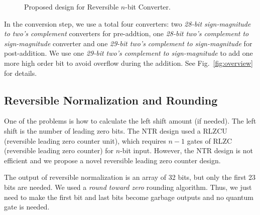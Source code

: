 \documentclass[%
reprint,
 amsmath,amssymb,
 aps,
]{revtex4-1}
\begin{document}
\begin{figure}[h]
\centering
\begin{minipage}{1.2in}
\end{minipage}
\caption{Proposed design for Reversible $n$-bit Converter.}
\label{fig:proposed_converter}
\end{figure}

In the conversion step, we use a total four converters: two \emph{28-bit sign-magnitude to two's complement} converters for pre-addtion, one \emph{28-bit two's complement to sign-magnitude} converter and one \emph{29-bit two's complement to sign-magnitude} for post-addition. We use one \emph{29-bit two's complement to sign-magnitude} to add one more high order bit to avoid overflow during the addition. See Fig.~\ref{fig:overview} for details. 

\subsection{Reversible Normalization and Rounding}

\par One of the problems is how to calculate the left shift amount (if needed). The left shift is the number of leading zero bits. The NTR design used a RLZCU (reversible leading zero counter unit), which requires $n-1$ gates of RLZC (reversible leading zero counter) for $n$-bit input. However, the NTR design is not efficient and we propose a novel reversible leading zero counter design. 
\par The output of reversible normalization is an array of 32 bits, but only the first 23 bits are needed. We used a \emph{round toward zero} rounding algorithm. Thus, we just need to make the first bit and last bits become garbage outputs and no quantum gate is needed. 
\end{document}
